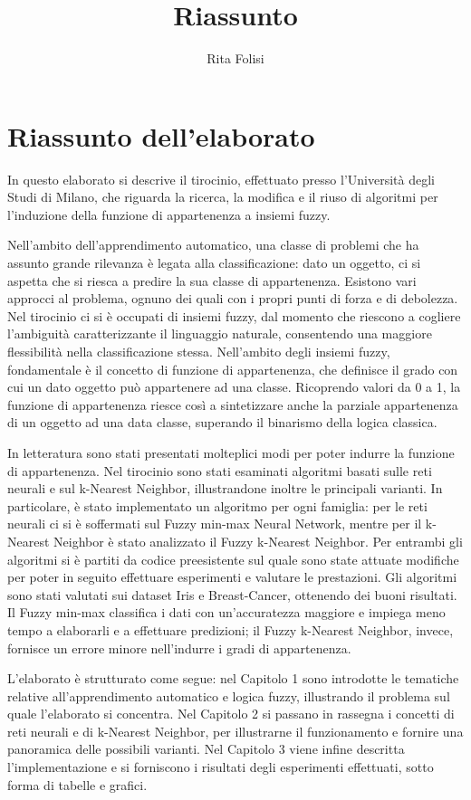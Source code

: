 \documentclass[11pt,  oneside, openany]{book}
\title{Riassunto}
\date{}
\author{Rita Folisi}
\begin{document}

  \begin{titlepage}
    
    \thispagestyle{empty}
  \end{titlepage}




	\chapter*{Riassunto dell'elaborato}
In questo elaborato si descrive il tirocinio, effettuato presso l'Università degli Studi di Milano, che riguarda la ricerca, la modifica e il riuso di algoritmi per l'induzione della funzione di appartenenza a insiemi fuzzy. 

Nell'ambito dell'apprendimento automatico, una classe di problemi che ha assunto grande rilevanza è legata alla classificazione: dato un oggetto, ci si aspetta che si riesca a predire la sua classe di appartenenza. Esistono vari approcci al problema, ognuno dei quali con i propri punti di forza e di debolezza. Nel tirocinio ci si è occupati di insiemi fuzzy, dal momento che riescono a cogliere l'ambiguità caratterizzante il linguaggio naturale, consentendo una maggiore flessibilità nella classificazione stessa. Nell'ambito degli insiemi fuzzy, fondamentale è il concetto di funzione di appartenenza, che definisce il grado con cui un dato oggetto può appartenere ad una classe. Ricoprendo valori da 0 a 1, la funzione di appartenenza riesce così a sintetizzare anche la parziale appartenenza di un oggetto ad una data classe, superando il binarismo della logica classica. 

In letteratura sono stati presentati molteplici modi per poter indurre la funzione di appartenenza. Nel tirocinio sono stati esaminati algoritmi basati sulle reti neurali e sul k-Nearest Neighbor, illustrandone inoltre le principali varianti. In particolare, è stato implementato un algoritmo per ogni famiglia: per le reti neurali ci si è soffermati sul Fuzzy min-max Neural Network, mentre per il k-Nearest Neighbor è stato analizzato il Fuzzy k-Nearest Neighbor. Per entrambi gli algoritmi si è partiti da codice preesistente sul quale sono state attuate modifiche per poter in seguito effettuare esperimenti e valutare le prestazioni. Gli algoritmi sono stati valutati sui dataset Iris e Breast-Cancer, ottenendo dei buoni risultati. Il Fuzzy min-max classifica i dati con un'accuratezza maggiore e impiega meno tempo a elaborarli e a effettuare predizioni; il Fuzzy k-Nearest Neighbor, invece, fornisce un errore minore nell'indurre i gradi di appartenenza. 

L'elaborato è strutturato come segue: nel Capitolo 1 sono introdotte le tematiche relative all'apprendimento automatico e logica fuzzy, illustrando il problema sul quale l'elaborato si concentra. Nel Capitolo 2 si passano in rassegna i concetti di reti neurali e di k-Nearest Neighbor, per illustrarne il funzionamento e fornire una panoramica delle possibili varianti. Nel Capitolo 3 viene infine descritta l'implementazione e si forniscono i risultati degli esperimenti effettuati, sotto forma di tabelle e grafici. 
\end{document}
